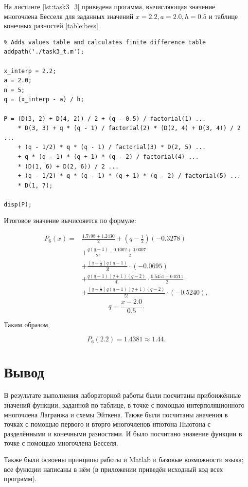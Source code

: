 На листинге \ref{lst:task3_3} приведена прогамма, вычисляющая значение многочлена Бесселя для заданных значений $x = 2.2, a = 2.0, h = 0.5$ и таблице конечных разностей \ref{table:bess}.

\begin{listing}[H]
\caption{программа, вычисляющая значение многочлена Бесселя}
\vspace{-20pt}
\label{lst:task3_3}
\begin{verbatim}
% Adds values table and calculates finite difference table
addpath('./task3_t.m');

x_interp = 2.2;
a = 2.0;
n = 5;
q = (x_interp - a) / h;

P = (D(3, 2) + D(4, 2)) / 2 + (q - 0.5) / factorial(1) ...
    * D(3, 3) + q * (q - 1) / factorial(2) * (D(2, 4) + D(3, 4)) / 2 ...
    + (q - 1/2) * q * (q - 1) / factorial(3) * D(2, 5) ...
    + q * (q - 1) * (q + 1) * (q - 2) / factorial(4) ...
    * (D(1, 6) + D(2, 6)) / 2 ...
    + (q - 1/2) * q * (q - 1) * (q + 1) * (q - 2) / factorial(5) ...
    * D(1, 7);

disp(P);
\end{verbatim}
\end{listing}

Итоговое значение вычисояется по формуле:

\[
\begin{aligned}
P_6(x)={}&
\frac{1.5708+1.2430}{2}
+\left(q-\frac{1}{2}\right)(-0.3278)\\
&+\frac{q(q-1)}{2!}\cdot\frac{0.1002+0.0307}{2}\\
&+\frac{\left(q-\frac{1}{2}\right)q(q-1)}{3!}\cdot(-0.0695)\\
&+\frac{q(q-1)(q+1)(q-2)}{4!}\cdot\frac{0.5451+0.0211}{2}\\
&+\frac{\left(q-\frac{1}{2}\right)q(q-1)(q+1)(q-2)}{5!}\cdot(-0.5240),
\end{aligned}
\]
\[
q=\frac{x-2.0}{0.5}.
\]

Таким образом,

\[
P_6(2.2) = 1.4381 \approx 1.44.
\]

\section{Вывод}

В результате выполнения лабораторной работы были посчитаны прибоижённые значений функции, заданной по таблице, в точке с помощью интерполяционного многочлена Лагранжа и схемы Эйткена. Также были посчитаны аначения в точках с помощью первого и вторго многочленов нтютона Ньютона с разделёнными и конечными разностями. И было посчитано знаяение функции в точке с помощью многочлена Бесселя.

Также были освоены принципы работы и Matlab и базовые возможности языка; все функции написаны в нём (в приложении приведён исходный код всех программ).
